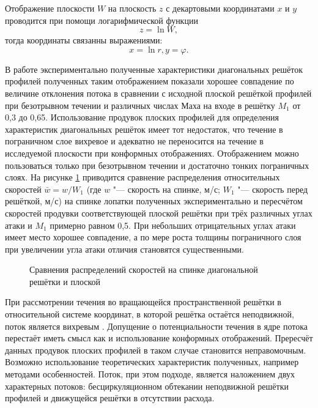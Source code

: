 Отображение плоскости \(W\) на плоскость \(z\) с декартовыми координатами \(x\) и \(y\) проводится при помощи логарифмической функции 
\begin{equation}
z = \ln W,
\end{equation}
тогда координаты связанны выражениями:
\begin{equation}
	x = \ln r, y = \varphi.
\end{equation}

 В работе \cite{Nikitin1966} экспериментально полученные характеристики диагональных решёток профилей полученных таким отображением показали хорошее совпадение по величине отклонения потока в сравнении с исходной плоской решёткой профилей при безотрывном течении и различных числах Маха на входе в решётку \(M_1\) от 0,3 до 0,65. Использование продувок плоских профилей для определения характеристик диагональных решёток имеет тот недостаток, что течение в пограничном слое вихревое и адекватно не переносится на течение в исследуемой плоскости при конформных отображениях. Отображением можно пользоваться только при безотрывном течении и достаточно тонких пограничных слоях. На рисунке \ref{fig:nikitin} приводится сравнение распределения относительных  скоростей \(\bar{w} = w/W_1\) (где \(w\) "--- скорость на спинке, м/с; \(W_1\) "--- скорость перед решёткой, м/с)  на спинке лопатки полученных экспериментально и пересчётом скоростей продувки соответствующей плоской решётки при трёх различных углах атаки и \(M_1\) примерно равном 0,5. При небольших отрицательных углах атаки имеет место хорошее совпадение, а по мере роста толщины пограничного слоя при увеличении угла атаки отличия становятся существенными.
 
 \begin{figure} [ht]
 	\centerfloat{
 		\\
 		\\
 		
 	}
 	\caption{Сравнения распределений скоростей на спинке диагональной решётки и плоской \cite{Nikitin1966}} 
 	\label{fig:nikitin}
 \end{figure}
 
При рассмотрении течения во вращающейся пространственной решётки в относительной системе координат, в которой решётка остаётся неподвижной, поток является вихревым \cite{Jukovskiy1967,Viktorov1969}. Допущение о потенциальности течения в ядре потока перестаёт иметь смысл как и использование конформных отображений. Прересчёт данных продувок плоских профилей в таком случае становится неправомочным. Возможно использование теоретических характеристик полученных, например методами особенностей. Поток, при этом подходе, является наложением двух характерных потоков: бесциркуляционном обтекании неподвижной решётки профилей и движущейся решётки в отсутствии расхода.
 
